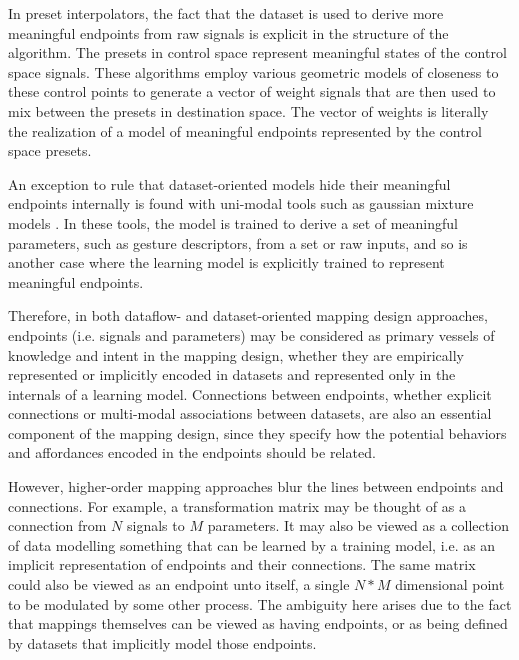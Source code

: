 \documentclass[main.tex]{subfiles}
\begin{document}
In preset interpolators, the fact that the dataset is used to derive more
meaningful endpoints from raw signals is explicit in the structure of the
algorithm. The presets in control space represent meaningful states of the
control space signals. These algorithms employ various geometric models of
closeness to these control points to generate a vector of weight signals that
are then used to mix between the presets in destination space. The vector of
weights is literally the realization of a model of meaningful endpoints
represented by the control space presets.

An exception to rule that dataset-oriented models hide their
meaningful endpoints internally is found with uni-modal tools such as gaussian
mixture models \cite{francoise2014nime_xmm}. In these tools, the model is trained to
derive a set of meaningful parameters, such as gesture descriptors, from a set or raw inputs,
and so is another case where the learning model is explicitly trained to represent
meaningful endpoints.

Therefore, in both dataflow- and dataset-oriented mapping design approaches,
endpoints (i.e. signals and parameters) may be considered as primary vessels of
knowledge and intent in the mapping design, whether they are empirically
represented or implicitly encoded in datasets and represented only in the
internals of a learning model.  Connections between endpoints,
whether explicit connections or multi-modal associations between datasets, are also an
essential component of the mapping design, since they specify how the potential
behaviors and affordances encoded in the endpoints should be related.  

However, higher-order mapping approaches blur the lines between endpoints and
connections.  For example, a transformation matrix may be thought of as a connection from
$N$ signals to $M$ parameters. It may also be viewed as a collection of
data modelling something that can be learned by a training model, i.e.
as an implicit representation of endpoints and their connections.  The same
matrix could also be viewed as an endpoint unto itself, a single $N*M$ dimensional
point to be modulated by some other process. The ambiguity here arises due
to the fact that mappings themselves can be viewed as having endpoints,
or as being defined by datasets that implicitly model those endpoints.
\end{document}
